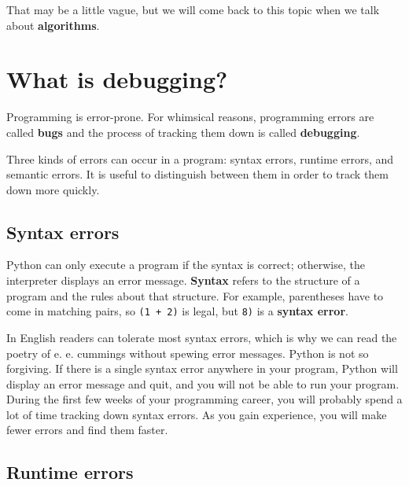 \documentclass[10pt]{book}
\begin{document}

That may be a little vague, but we will come back to this topic
when we talk about {\bf algorithms}.

\section{What is debugging?}

Programming is error-prone.  For whimsical reasons, programming errors
are called {\bf bugs} and the process of tracking them down is called
{\bf debugging}.


Three kinds of errors can occur in a program: syntax errors, runtime 
errors, and semantic errors. It is useful
to distinguish between them in order to track them down more quickly.

\subsection{Syntax errors}

Python can only execute a program if the syntax is
correct; otherwise, the interpreter displays an error message.
{\bf Syntax} refers to the structure of a program and the rules about
that structure.  
For example, parentheses have to come in matching pairs, so
{\tt (1 + 2)} is legal, but {\tt 8)} is a {\bf syntax error}.


In English readers can tolerate most syntax errors, which is why we
can read the poetry of e. e. cummings without spewing error messages.
Python is not so forgiving.  If there is a single syntax error
anywhere in your program, Python will display an error message and quit,
and you will not be able to run your program. During the first few
weeks of your programming career, you will probably spend a lot of
time tracking down syntax errors.  As you gain experience, you will
make fewer errors and find them faster.

\subsection{Runtime errors}
\label{runtime}
\end{document}
